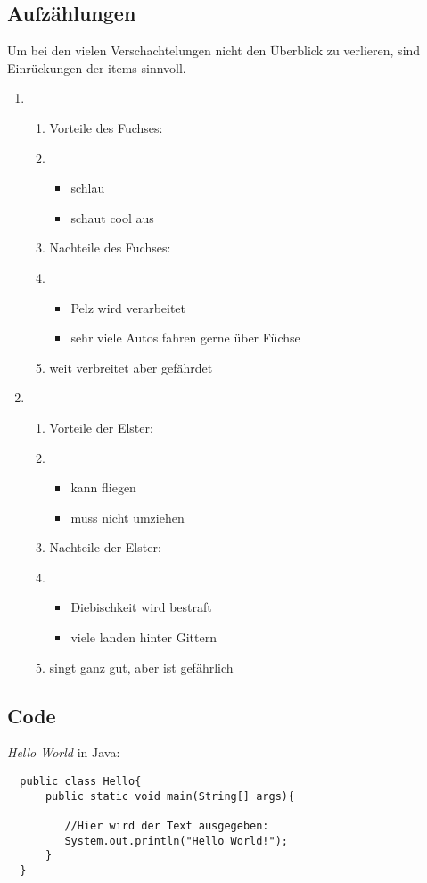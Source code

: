 \documentclass[a4paper, pdftex, ngerman, 11pt]{article}
\begin{document}
\subsection{Aufzählungen}
Um bei den vielen Verschachtelungen nicht den Überblick zu verlieren, sind Einrückungen der items sinnvoll.
\begin{enumerate}
  \item 
  \begin{enumerate}
    \item Vorteile des Fuchses:
    \item
    \begin{itemize}
      \item schlau
      \item schaut cool aus
    \end{itemize}
    \item Nachteile des Fuchses:
    \item
    \begin{itemize}
      \item Pelz wird verarbeitet
      \item sehr viele Autos fahren gerne über Füchse
    \end{itemize}
    \item weit verbreitet aber gefährdet
  \end{enumerate}
  \item
  \begin{enumerate}
    \item Vorteile der Elster:
    \item
    \begin{itemize}
      \item kann fliegen
      \item muss nicht umziehen
    \end{itemize}
    \item Nachteile der Elster:
    \item
    \begin{itemize}
      \item Diebischkeit wird bestraft
      \item viele landen hinter Gittern
    \end{itemize}
      \item singt ganz gut, aber ist gefährlich
  \end{enumerate}
\end{enumerate}

\subsection{Code}
\textit{Hello World} in Java:\\
\begin{lstlisting}
  public class Hello{
      public static void main(String[] args){
      
         //Hier wird der Text ausgegeben:
         System.out.println("Hello World!");
      }
  }
\end{lstlisting}
\end{document}
